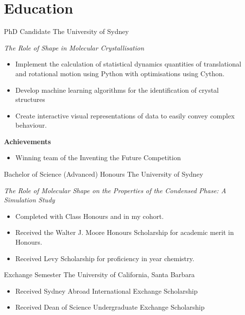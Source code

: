 



\makecvtitle{}

\vspace{-4em}
\section{Education}

{PhD Candidate}
{The University of Sydney}{}{}
{%
  \emph{The Role of Shape in Molecular Crystallisation}
  \begin{itemize}
    \item Implement the calculation of statistical dynamics quantities of translational and rotational motion
      using Python with optimisations using Cython.
    \item Develop machine learning algorithms for the identification of crystal structures
    \item Create interactive visual representations of data to easily convey complex behaviour.
  \end{itemize}
  \textbf{Achievements}
  \begin{itemize}
    \item Winning team of the Inventing the Future Competition
  \end{itemize}
}
\vspace{1em}


{Bachelor of Science (Advanced) Honours}
{The University of Sydney}{}{}
{%
  \emph{The Role of Molecular Shape on the Properties of the Condensed Phase: A Simulation Study}
  \begin{itemize}
    \item Completed with  Class Honours and  in my cohort.
    \item Received the Walter J. Moore Honours Scholarship for academic merit in Honours.
    \item Received Levy Scholarship for proficiency in  year chemistry.
  \end{itemize}
}
\vspace{1em}

{Exchange Semester}
{The University of California, Santa Barbara}{}{}
{%
\begin{itemize}
  \item Received Sydney Abroad International Exchange Scholarship
  \item Received Dean of Science Undergraduate Exchange Scholarship
\end{itemize}
}

